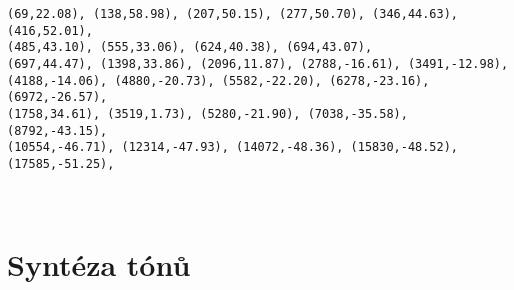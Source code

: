 \documentclass[11pt]{article}
\begin{document}
    \begin{Verbatim}[commandchars=\\\{\}]
(69,22.08), (138,58.98), (207,50.15), (277,50.70), (346,44.63), (416,52.01),
(485,43.10), (555,33.06), (624,40.38), (694,43.07),
(697,44.47), (1398,33.86), (2096,11.87), (2788,-16.61), (3491,-12.98),
(4188,-14.06), (4880,-20.73), (5582,-22.20), (6278,-23.16), (6972,-26.57),
(1758,34.61), (3519,1.73), (5280,-21.90), (7038,-35.58), (8792,-43.15),
(10554,-46.71), (12314,-47.93), (14072,-48.36), (15830,-48.52), (17585,-51.25),
    \end{Verbatim}

    \begin{center}
    \end{center}
    { \hspace*{\fill} \\}
    
    \hypertarget{syntuxe9za-tuxf3nux16f}{%
\section{Syntéza tónů}\label{syntuxe9za-tuxf3nux16f}}
\end{document}
